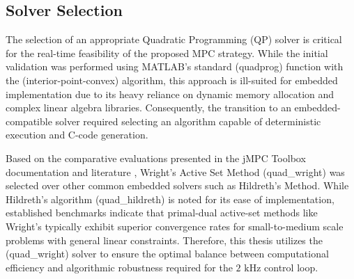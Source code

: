 \subsection{Solver Selection}
The selection of an appropriate Quadratic Programming (QP) solver is critical for the real-time feasibility
of the proposed MPC strategy. While the initial validation was performed using MATLAB's standard ({\selectfont quadprog})
function with the ({\selectfont interior-point-convex}) algorithm, this approach is ill-suited
for embedded implementation due to its heavy reliance on dynamic memory allocation and complex linear algebra
libraries. Consequently, the transition to an embedded-compatible solver required selecting an algorithm capable
of deterministic execution and C-code generation.\par
Based on the comparative evaluations presented in the jMPC Toolbox documentation and
literature \cite{currie2014practical}, Wright's Active Set Method ({\selectfont quad\_wright}) was
selected over other common embedded solvers such as Hildreth's Method. While Hildreth's algorithm
({\selectfont quad\_hildreth}) is noted for its ease of implementation, established benchmarks
indicate that primal-dual active-set methods like Wright's typically exhibit superior convergence rates for small-to-medium
scale problems with general linear constraints. Therefore, this thesis utilizes the ({\selectfont quad\_wright})
solver to ensure the optimal balance between computational efficiency and algorithmic robustness required for the $2 \text{ kHz}$ control loop.\par
